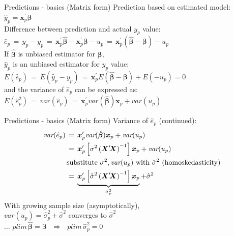 \documentclass{beamer}
\begin{document}
\begin{frame}{Predictions - basics (Matrix form)}
Prediction based on estimated model:\\
\vspace{0.3cm}
$\hat{y}_p = \bm{x}_{p}^\prime \hat{\bm{\beta}}$\\
\vspace{0.3cm}
Difference between prediction and actual $y_p$ value:\\
\vspace{0.3cm}
$\hat{e}_p \,=\, \hat{y}_p - y_p
  \,=\, \bm{x}_{p}^\prime \hat{\bm{\beta}} - \bm{x}_{p}^\prime \bm{\beta} - u_p
  \,=\, \bm{x}_{p}^\prime (\hat{\bm{\beta}} - \bm{\beta}) - u_p$\\
\vspace{0.3cm}
If $\hat{\bm{\beta}}$ is unbiased estimator for $\bm{\beta}$, \\
$\hat{y}_p$ is an unbiased estimator for $y_p$ value:\\
\vspace{0.3cm}
$E(\hat{e}_p) \,=\, E(\hat{y}_p - y_p)
   \,=\, \bm{x}_{p}^\prime E(\hat{\bm{\beta}} - \bm{\beta}) + E(-u_p) =0$\\
\vspace{0.3cm}
and the variance of $\hat{e}_p$ can be expressed as:\\
\vspace{0.3cm}
$E(\hat{e}_p^2) \,=\,\textit{var}(\hat{e}_p)
   \,=\, \bm{x}_{p}^\prime \textit{var}(\hat{\bm{\beta}})\bm{x}_{p} + \textit{var}(u_p) $
\end{frame}


\begin{frame}{Predictions - basics (Matrix form)}
Variance of $\hat{e}_p$ (continued):
\begin{equation*}
\begin{aligned}
\textit{var}(\hat{e}_p) \,&=\,
  \bm{x}_{p}^\prime \textit{var}(\hat{\bm{\beta}})\bm{x}_{p} + \textit{var}(u_p)\\
 \,&=\,
   \bm{x}_{p}^\prime \left[ \sigma^2 \left( \bm{X}^\prime \! \bm{X}  \right)^{-1} \right] \bm{x}_{p} + \textit{var}(u_p)\\
   & \textnormal{substitute $\sigma^2, \textit{var}(u_p)$ with $\hat{\sigma}^2$ (homoskedasticity)}\\
  \,&=\,
   \underbrace{\bm{x}_{p}^\prime \left[ \hat{\sigma}^2 \left( \bm{X}^\prime \! \bm{X}  \right)^{-1} \right] \bm{x}_{p}}_{\hat{\sigma}_p^2}
   + \hat{\sigma}^2
\end{aligned}
\end{equation*}
With growing sample size (asymptotically), \\
$\textit{var}(u_p) = \hat{\sigma}_p^2 + \hat{\sigma}^2$ converges to $\hat{\sigma}^2$\\
$\dots$ $\textit{plim} \, \hat{\bm{\beta}} = \bm{\beta} \,\,\,\, \Rightarrow \,\,\,\, 
  \textit{plim} \, \hat{\sigma}_p^2 = 0$

\end{frame}
\end{document}
